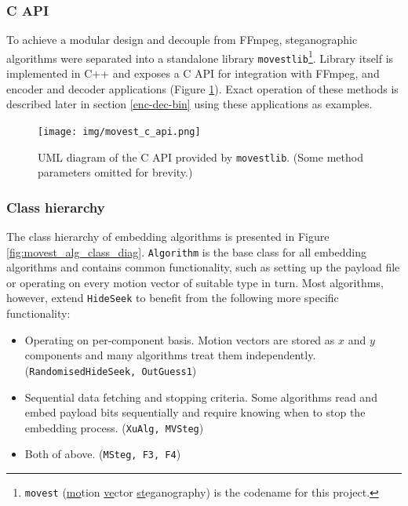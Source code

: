 \documentclass[12pt,british,twoside,notitlepage,usenames,dvipsnames,hypens,final]{report}
\numberwithin{equation}{section}
\numberwithin{figure}{section}
\begin{document}
\subsubsection{C API}

To achieve a modular design and decouple from FFmpeg, steganographic algorithms were separated into a standalone library \texttt{movestlib}\footnote{\texttt{movest} (\underline{mo}tion \underline{ve}ctor \underline {st}eganography) is the codename for this project.}. Library itself is implemented in C++ and exposes a C API for integration with FFmpeg, and encoder and decoder applications (Figure \ref{fig:movest-c-api}). Exact operation of these methods is described later in section \ref{enc-dec-bin} using these applications as examples.

\begin{figure}[tbh]
\centerline{\texttt{[image: img/movest\_c\_api.png]}}
\caption{UML diagram of the C API provided by \texttt{movestlib}. (Some method parameters omitted for brevity.)}
\label{fig:movest-c-api}
\end{figure}

\subsubsection{Class hierarchy}

The class hierarchy of embedding algorithms is presented in Figure \ref{fig:movest_alg_class_diag}. \texttt{Algorithm} is the base class for all embedding algorithms and contains common functionality, such as setting up the payload file or operating on every motion vector of suitable type in turn. Most algorithms, however, extend \texttt{HideSeek} to benefit from the following more specific functionality:
\begin{itemize}
\item Operating on per-component basis. Motion vectors are stored as $x$ and $y$ components and many algorithms treat them independently. (\texttt{RandomisedHideSeek, OutGuess1})
\item Sequential data fetching and stopping criteria. Some algorithms read and embed payload bits sequentially and require knowing when to stop the embedding process. (\texttt{XuAlg, MVSteg})
\item Both of above. (\texttt{MSteg, F3, F4})
\end{itemize}
\end{document}
